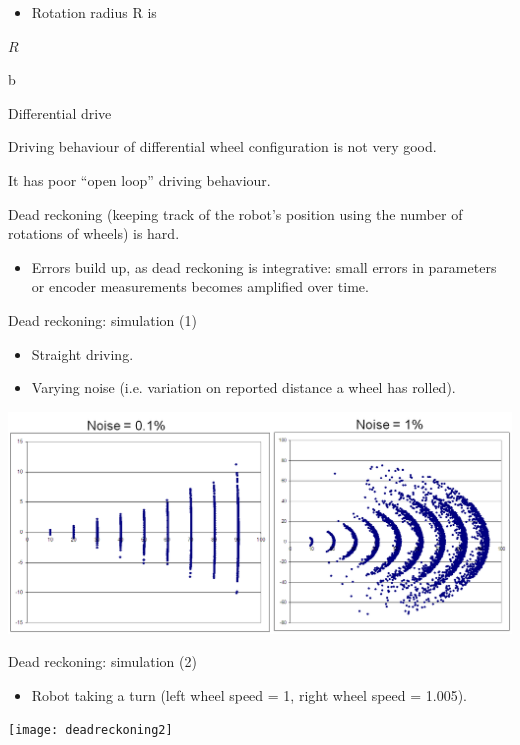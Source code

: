 \documentclass[compress]{beamer}
\begin{document}
\begin{frame}{}

\begin{itemize}
    \item Rotation radius R is
\end{itemize}

$R$

b

\end{frame}

\begin{frame}{Differential drive}

Driving behaviour of differential wheel configuration is not very good.

It has poor ``open loop'' driving behaviour.

Dead reckoning (keeping track of the robot's position using the number
of rotations of wheels) is hard.

\begin{itemize}
    \item Errors build up, as dead reckoning is integrative: small errors in
  parameters or encoder measurements becomes amplified over time.
\end{itemize}

\end{frame}

\begin{frame}{Dead reckoning: simulation (1)}

\begin{itemize}
    \item Straight driving.
    \item Varying noise (i.e. variation on reported distance a wheel has
  rolled).
\end{itemize}

    \begin{center}
        \includegraphics[width=0.7\linewidth]{deadreckoning1}
    \end{center}

\end{frame}

\begin{frame}{Dead reckoning: simulation (2)}

\begin{itemize}
    \item Robot taking a turn (left wheel speed = 1, right wheel speed = 1.005).
\end{itemize}

    \begin{center}
        \texttt{[image: deadreckoning2]}
    \end{center}
\end{frame}
\end{document}
